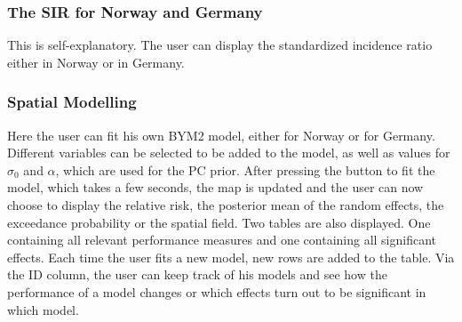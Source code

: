 \subsubsection*{The SIR for Norway and Germany}
This is self-explanatory. The user can display the standardized incidence ratio either in Norway or in Germany.
\clearpage
\subsubsection*{Spatial Modelling}
Here the user can fit his own BYM2 model, either for Norway or for Germany. Different variables can be selected to be added to the model, as well as values for $\sigma_0$ and $\alpha$, which are used for the PC prior. After pressing the button to fit the model, which takes a few seconds, the map is updated and the user can now choose to display the relative risk, the posterior mean of the random effects, the exceedance probability or the spatial field. Two tables are also displayed. One containing all relevant performance measures and one containing all significant effects. Each time the user fits a new model, new rows are added to the table. Via the ID column, the user can keep track of his models and see how the performance of a model changes or which effects turn out to be significant in which model.

